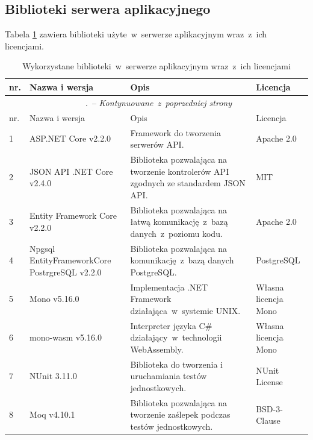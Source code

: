\documentclass[a4paper,11pt,twoside]{report}
\renewcommand*{\thetable}{\arabic{chapter}.\arabic{table}}
\theoremstyle{definition}
\begin{document}
        \subsection{Biblioteki serwera aplikacyjnego}
        Tabela \ref{biblioteki-serwer} zawiera biblioteki użyte~w~serwerze aplikacyjnym wraz~z~ich licencjami.
        
    \begin{longtable}{| p{} | p{} | p{} | p{} |}
        \caption{Wykorzystane biblioteki~w~serwerze aplikacyjnym wraz~z~ich licencjami}
        \label{biblioteki-serwer} \\
        \hline
        nr. & Nazwa i wersja & Opis & Licencja \\ \hline
        \endfirsthead
        \multicolumn{4}{c}{\tablename\ \thetable\ -- \textit{Kontynuowane~z~poprzedniej strony}} \\
        \hline
        nr. & Nazwa i wersja & Opis & Licencja \\ \hline
        \endhead
        
        1 & ASP.NET Core v2.2.0 & Framework do tworzenia serwerów API. & Apache 2.0 \\ \hline
        2 & JSON API .NET Core v2.4.0 & Biblioteka pozwalająca na tworzenie kontrolerów API zgodnych ze standardem JSON API. & MIT \\ \hline
        3 & Entity Framework Core v2.2.0 & Biblioteka pozwalająca na łatwą komunikację~z~bazą danych~z~poziomu kodu. & Apache 2.0 \\ \hline
        4 & Npgsql EntityFrameworkCore PostrgreSQL v2.2.0 & Biblioteka pozwalająca na komunikację~z~bazą danych PostgreSQL. & PostgreSQL \cite{licencja-postgresql} \\ \hline
        5 & Mono v5.16.0 & Implementacja .NET Framework działająca~w~systemie UNIX. & Własna licencja Mono \cite{licencja-mono} \\ \hline
        6 & mono-wasm v5.16.0 & Interpreter języka C\# działający~w~technologii WebAssembly. & Własna licencja Mono \cite{licencja-mono} \\ \hline
        7 & NUnit 3.11.0 & Biblioteka do tworzenia i uruchamiania testów jednostkowych. & NUnit License \cite{licencja-nunit} \\ \hline
        8 & Moq v4.10.1 & Biblioteka pozwalająca na tworzenie zaślepek podczas testów jednostkowych. & BSD-3-Clause \\ \hline
    \end{longtable}
        
\end{document}
